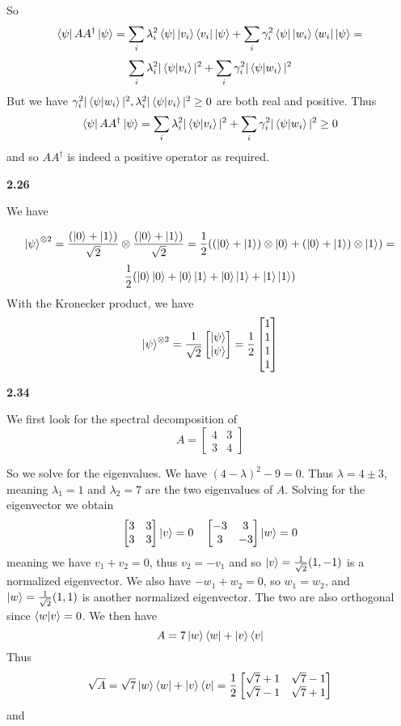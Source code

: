 So 
\[\bra{\psi}AA^\dag\ket{\psi} =  \sum_{i}\lambda_i^2\bra{\psi}\ket{v_i}\bra{v_i}\ket{\psi} +\sum_{i}\gamma_i^2  \bra{\psi}\ket{w_i}\bra{w_i}\ket{\psi} =\]\[ \sum_{i}\lambda_i^2|\braket{\psi|v_i}|^2+\sum_{i}\gamma_i^2  |\braket{\psi|w_i}|^2\]
But we have $\gamma_i^2  |\braket{\psi|w_i}|^2,\lambda_i^2|\braket{\psi|v_i}|^2\geq 0$ are both real and positive. Thus \[\bra{\psi}AA^\dag\ket{\psi} =\sum_{i}\lambda_i^2|\braket{\psi|v_i}|^2+\sum_{i}\gamma_i^2  |\braket{\psi|w_i}|^2 \geq 0\] and so $ A A^\dag$ is indeed a positive operator as required. 
    

\textbf{2.26}

We have

\[\ket{\psi}^{\otimes2} = \frac{(\ket{0} + \ket{1})}{\sqrt{2}}\otimes\frac{(\ket{0} + \ket{1})}{\sqrt{2}} =\frac{1}{2}((\ket{0}+\ket{1})\otimes\ket{0} + (\ket{0}+\ket{1})\otimes\ket{1}) =\] \[\frac{1}{2}(\ket{0}\ket{0}+\ket{0}\ket{1} + \ket{0}\ket{1} + \ket{1}\ket{1})\]
With the Kronecker product, we have 
\[ \ket{\psi}^{\otimes 2} = \frac{1}{\sqrt{2}}
\begin{bmatrix}
    \ket{\psi}\\
    \ket{\psi}
\end{bmatrix}
=\frac{1}{2}
\begin{bmatrix}
    1\\
    1\\
    1\\
    1\\
\end{bmatrix}\]


\textbf{2.34}

We first look for the spectral decomposition of 
\[A = 
\begin{bmatrix}
    4 & 3\\
    3 & 4
\end{bmatrix}\]

So we solve for the eigenvalues. We have $ (4-\lambda)^2 - 9 = 0 $. Thus $ \lambda = 4\pm 3$, meaning $\lambda_1 = 1$ and $\lambda_2 = 7$ are the two eigenvalues of $A$. Solving for the eigenvector we obtain \[\begin{bmatrix}
    3 & 3\\
    3 & 3
\end{bmatrix} 
\ket{v} = 0 \quad 
\begin{bmatrix}
    -3 & 3\\
    3 & -3
\end{bmatrix} 
\ket{w} = 0 \]meaning we have $v_1 + v_2 = 0$, thus $v_2 = -v_1$ and so $\ket{v} = \frac{1}{\sqrt{2}}(1,-1)$ is a normalized eigenvector. We also have $ -w_1 +w_2 = 0$, so $ w_1 = w_2$, and $ \ket{w} = \frac{1}{\sqrt{2}}(1,1)$ is another normalized eigenvector. The two are also orthogonal since $ \braket{w|v} = 0$. We then have 
\[A = 7\ket{w}\bra{w} + \ket{v}\bra{v}\]Thus \[\sqrt{A} = \sqrt{7}\ket{w}\bra{w} + \ket{v}\bra{v} = 
\frac{1}{2}\begin{bmatrix} 
\sqrt{7} + 1 & \sqrt{7} - 1\\
\sqrt{7} - 1 & \sqrt{7} + 1
\end{bmatrix}\]
and

